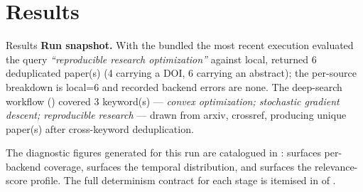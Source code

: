 \documentclass[
  ignorenonframetext,
]{beamer}
\author{\texorpdfstring{}{}}
\date{}
\begin{document}
\section{Results}\label{sec:results}

\begin{frame}{Results}
\textbf{Run snapshot.} With the bundled 
the most recent execution evaluated the query \emph{``reproducible
research optimization''} against local, returned 6 deduplicated paper(s)
(4 carrying a DOI, 6 carrying an abstract); the per-source breakdown is
local=6 and recorded backend errors are none. The deep-search workflow
() covered 3 keyword(s) --- \emph{convex
optimization; stochastic gradient descent; reproducible research} ---
drawn from arxiv, crossref, producing unique paper(s) after
cross-keyword deduplication.

The diagnostic figures generated for this run are catalogued in
:  surfaces
per-backend coverage,  surfaces the temporal
distribution, and  surfaces the
relevance-score profile. The full determinism contract for each stage is
itemised in  of .
\end{frame}
\end{document}

